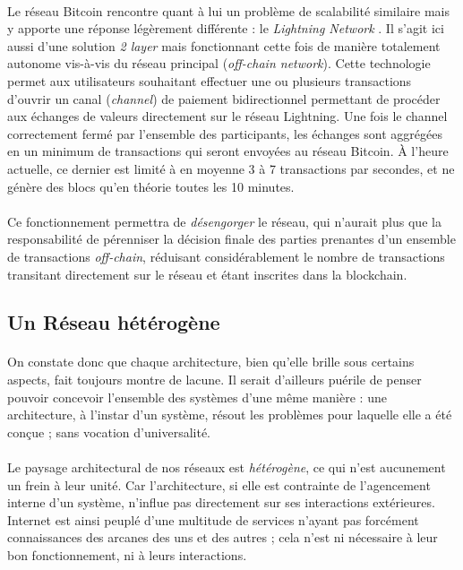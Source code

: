 \paragraph{} Le réseau Bitcoin rencontre quant à lui un problème de scalabilité similaire mais y apporte une réponse légèrement
différente : le \emph{Lightning Network} \cite{Blockchain2}. Il s'agit ici aussi d'une solution \emph{2 layer} mais
fonctionnant cette fois de manière totalement autonome vis-à-vis du réseau principal (\emph{off-chain network}). Cette 
technologie permet aux utilisateurs souhaitant effectuer une ou plusieurs transactions d'ouvrir un canal (\emph{channel})
de paiement bidirectionnel permettant de procéder aux échanges de valeurs directement sur le réseau Lightning. Une fois
le channel correctement fermé par l'ensemble des participants, les échanges sont aggrégées en un minimum de transactions
qui seront envoyées au réseau Bitcoin. À l'heure actuelle, ce dernier est limité à en moyenne 3 à 7 transactions par secondes,
et ne génère des blocs qu'en théorie toutes les 10 minutes.


\paragraph{} Ce fonctionnement permettra de \emph{désengorger} le réseau, qui n'aurait plus que la responsabilité de pérenniser
la décision finale des parties prenantes d'un ensemble de transactions \emph{off-chain}, réduisant considérablement le nombre
de transactions transitant directement sur le réseau et étant inscrites dans la blockchain.


\subsection*{Un Réseau hétérogène}

\paragraph{} On constate donc que chaque architecture, bien qu'elle brille sous certains aspects, fait toujours montre de
lacune. Il serait d'ailleurs puérile de penser pouvoir concevoir l'ensemble des systèmes d'une même manière : une architecture,
à l'instar d'un système, résout les problèmes pour laquelle elle a été conçue ; sans vocation d'universalité.

\paragraph{} Le paysage architectural de nos réseaux est \emph{hétérogène}, ce qui n'est aucunement un frein à leur unité.
Car l'architecture, si elle est contrainte de l'agencement interne d'un système, n'influe pas directement sur ses interactions
extérieures. Internet est ainsi peuplé d'une multitude de services n'ayant pas forcément connaissances des arcanes des uns et
des autres ; cela n'est ni nécessaire à leur bon fonctionnement, ni à leurs interactions.